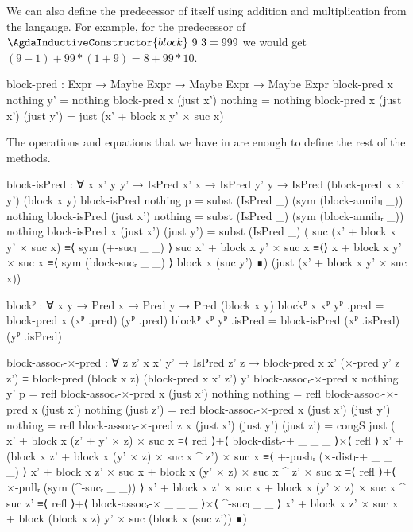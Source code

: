 We can also define the predecessor of  itself
using addition and multiplication from the langauge. For example, for the
predecessor of $\AgdaInductiveConstructor{block}\ 9\ 3 = 999$ we would get
$(9-1) + 99 * (1+9) = 8 + 99 * 10$.
\begin{code}
  block-pred :
    Expr → Maybe Expr → Maybe Expr → Maybe Expr
  block-pred x nothing    y'         = nothing
  block-pred x (just x')  nothing    = nothing
  block-pred x (just x')  (just y')  =
    just (x' + block x y' × suc x)
\end{code}
The operations and equations that we have in  are enough to
define the rest of the methods.
\begin{code}[hide]
  block-isPred :
    ∀ {x x' y y'} → IsPred x' x → IsPred y' y →
    IsPred (block-pred x x' y') (block x y)
  block-isPred nothing p = subst (IsPred _) (sym (block-annihₗ _)) nothing
  block-isPred (just x') nothing =
    subst (IsPred _) (sym (block-annihᵣ _)) nothing
  block-isPred {x} (just x') (just y') =
    subst (IsPred _)
      ( suc (x' + block x y' × suc x) ≡⟨ sym (+-sucₗ _ _) ⟩
        suc x' + block x y' × suc x   ≡⟨⟩
        x + block x y' × suc x         ≡⟨ sym (block-sucᵣ _ _) ⟩
        block x (suc y')               ∎)
      (just (x' + block x y' × suc x))

  blockᴾ : ∀ {x y} → Pred x → Pred y → Pred (block x y)
  blockᴾ {x} xᴾ yᴾ .pred = block-pred x (xᴾ .pred) (yᴾ .pred)
  blockᴾ xᴾ yᴾ .isPred = block-isPred (xᴾ .isPred) (yᴾ .isPred)

  block-assocᵣ-×-pred :
    ∀ {z z'} x x' y' → IsPred z' z →
    block-pred x x' (×-pred y' z z') ≡
    block-pred (block x z) (block-pred x x' z') y'
  block-assocᵣ-×-pred x nothing y' p = refl
  block-assocᵣ-×-pred x (just x') nothing nothing = refl
  block-assocᵣ-×-pred x (just x') nothing (just z') = refl
  block-assocᵣ-×-pred x (just x') (just y') nothing = refl
  block-assocᵣ-×-pred {z} x (just x') (just y') (just z') =
    congS just
      ( x' + block x (z' + y' × z) × suc x                                      ≡⟨ refl ⟩+⟨ block-distᵣ-+ _ _ _ ⟩×⟨ refl ⟩
        x' + (block x z' + block x (y' × z) × suc x ^ z') × suc x               ≡⟨ +-pushᵣ (×-distₗ-+ _ _ _) ⟩
        x' + block x z' × suc x + block x (y' × z) × suc x ^ z' × suc x         ≡⟨ refl ⟩+⟨ ×-pullᵣ (sym (^-sucᵣ _ _)) ⟩
        x' + block x z' × suc x + block x (y' × z) × suc x ^ suc z'             ≡⟨ refl ⟩+⟨ block-assocᵣ-× _ _ _ ⟩×⟨ ^-sucₗ _ _ ⟩
        x' + block x z' × suc x + block (block x z) y' × suc (block x (suc z')) ∎)


\end{code}

